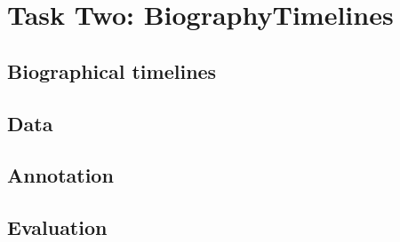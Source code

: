 \section{Task Two: BiographyTimelines}\label{sec:biotime}

\subsection{Biographical timelines}

\subsection{Data}

\subsection{Annotation}


\subsection{Evaluation}

